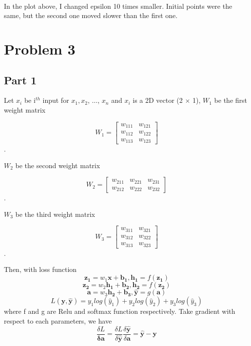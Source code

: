 \documentclass[11pt]{article}
\begin{document}
    \begin{center}
    \end{center}
    { \hspace*{\fill} \\}
    
    In the plot above, I changed epsilon 10 times smaller. Initial points
were the same, but the second one moved slower than the first one.

    \section{Problem 3}\label{problem-3}

\subsection{Part 1}\label{part-1}

    Let \(x_i\) be i\(^{th}\) input for \(x_1, x_2\), \(\dots\), \(x_n\) and
\(x_i\) is a 2D vector (2 \(\times\) 1), \(W_1\) be the first weight
matrix

\[W_1 = \begin{bmatrix}w_{111}&w_{121}\\w_{112}&w_{122}\\w_{113}&w_{123}\end{bmatrix}\].

\(W_2\) be the second weight matrix

\[W_2 = \begin{bmatrix}w_{211}&w_{221}&w_{231}\\w_{212}&w_{222}&w_{232}\end{bmatrix}\].

\(W_3\) be the third weight matrix

\[W_3 = \begin{bmatrix}w_{311}&w_{321}\\w_{312}&w_{322}\\w_{313}&w_{323}\end{bmatrix}\].

Then, with loss function
\[\boldsymbol{z_1} = w_1 \boldsymbol{x} + \boldsymbol{b_1}, \boldsymbol{h_1} = f(\boldsymbol{z_1})\]
\[\boldsymbol{z_2} = w_2 \boldsymbol{h_1} + \boldsymbol{b_2}, \boldsymbol{h_2} = f(\boldsymbol{z_2})\]
\[\boldsymbol{a} = w_3 \boldsymbol{h_2} + \boldsymbol{b_3}, \boldsymbol{\hat y} = g(\boldsymbol{a})\]
\[L(\boldsymbol{y},\boldsymbol{\hat y}) = y_1 log(\hat y_1)+y_2 log(\hat y_2)+y_3 log(\hat y_3)\]
where f and g are Relu and softmax function respectively. Take gradient
with respect to each parameters, we have
\[\frac{\delta L}{\boldsymbol{\delta a}} = \frac{\delta L}{\delta  \boldsymbol{\hat y}} \frac{\delta  \boldsymbol{\hat y}}{\delta \boldsymbol{a}} =  \boldsymbol{\hat y}-\boldsymbol{y}\]
\end{document}
